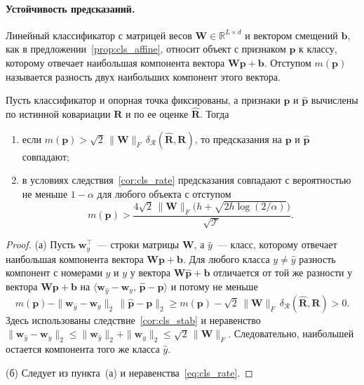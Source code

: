 \paragraph{Устойчивость предсказаний.} Линейный классификатор с матрицей весов $\mathbf{W} \in \mathbb{R}^{L \times d}$ и вектором смещений $\mathbf{b}$, как в предложении~\ref{prop:cls_affine}, относит объект с признаком $\mathbf{p}$ к классу, которому отвечает наибольшая компонента вектора $\mathbf{W}\mathbf{p} + \mathbf{b}$. Отступом $m(\mathbf{p})$ называется разность двух наибольших компонент этого вектора.

\begin{corollary}\label{cor:cls_margin}
Пусть классификатор и опорная точка фиксированы, а признаки $\mathbf{p}$ и $\hat{\mathbf{p}}$ вычислены по истинной ковариации $\mathbf{R}$ и по ее оценке $\hat{\mathbf{R}}$. Тогда
\begin{enumerate}
    \item[(а)] если $m(\mathbf{p}) > \sqrt{2}\,\|\mathbf{W}\|_F\, \delta_{\mathcal{R}}(\hat{\mathbf{R}}, \mathbf{R})$, то предсказания на $\mathbf{p}$ и $\hat{\mathbf{p}}$ совпадают;
    \item[(б)] в условиях следствия~\ref{cor:cls_rate} предсказания совпадают с вероятностью не меньше $1 - \alpha$ для любого объекта с отступом
    \begin{equation}\label{eq:cls_margin}
    m(\mathbf{p}) > \frac{4\sqrt{2}\,\|\mathbf{W}\|_F\big(h + \sqrt{2h\log(2/\alpha)}\big)}{\sqrt{\mathcal{T}}} .
    \end{equation}
\end{enumerate}
\end{corollary}
\begin{proof}
(а) Пусть $\mathbf{w}_y^{\top}$~--- строки матрицы $\mathbf{W}$, а $\hat{y}$~--- класс, которому отвечает наибольшая компонента вектора $\mathbf{W}\mathbf{p} + \mathbf{b}$. Для любого класса $y \neq \hat{y}$ разность компонент с номерами $\hat{y}$ и $y$ у вектора $\mathbf{W}\hat{\mathbf{p}} + \mathbf{b}$ отличается от той же разности у вектора $\mathbf{W}\mathbf{p} + \mathbf{b}$ на $\langle \mathbf{w}_{\hat{y}} - \mathbf{w}_y,\, \hat{\mathbf{p}} - \mathbf{p} \rangle$ и потому не меньше
\begin{equation*}
m(\mathbf{p}) - \|\mathbf{w}_{\hat{y}} - \mathbf{w}_y\|_2\, \|\hat{\mathbf{p}} - \mathbf{p}\|_2 \geqslant m(\mathbf{p}) - \sqrt{2}\,\|\mathbf{W}\|_F\, \delta_{\mathcal{R}}(\hat{\mathbf{R}}, \mathbf{R}) > 0 .
\end{equation*}
Здесь использованы следствие~\ref{cor:cls_stab} и неравенство $\|\mathbf{w}_{\hat{y}} - \mathbf{w}_y\|_2 \leqslant \|\mathbf{w}_{\hat{y}}\|_2 + \|\mathbf{w}_y\|_2 \leqslant \sqrt{2}\,\|\mathbf{W}\|_F$. Следовательно, наибольшей остается компонента того же класса $\hat{y}$.

(б) Следует из пункта~(а) и неравенства~\eqref{eq:cls_rate}.
\end{proof}

